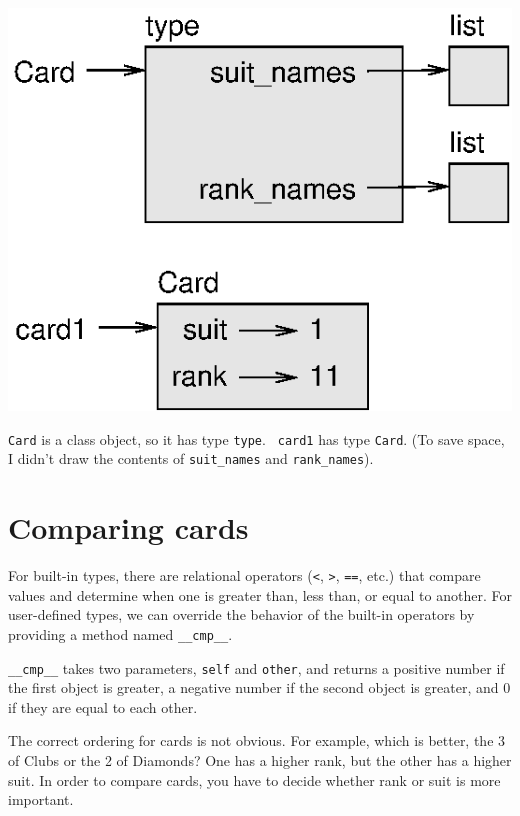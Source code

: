 \documentclass[10pt]{book}
\begin{document}

\beforefig
\centerline{\includegraphics{figs/card1.eps}}
\afterfig

{\tt Card} is a class object, so it has type {\tt type}.  {\tt
card1} has type {\tt Card}.  (To save space, I didn't draw the
contents of \verb"suit_names" and \verb"rank_names").


\section{Comparing cards}
\label{comparecard}


For built-in types, there are relational operators
({\tt <}, {\tt >}, {\tt ==}, etc.)
that compare
values and determine when one is greater than, less than, or equal to
another.  For user-defined types, we can override the behavior of
the built-in operators by providing a method named
\verb"__cmp__".  

\verb"__cmp__" takes two parameters, {\tt self} and {\tt other},
and returns a positive number if the first object is greater, a
negative number if the second object is greater, and 0 if they are
equal to each other.


The correct ordering for cards is not obvious.
For example, which
is better, the 3 of Clubs or the 2 of Diamonds?  One has a higher
rank, but the other has a higher suit.  In order to compare
cards, you have to decide whether rank or suit is more important.
\end{document}
